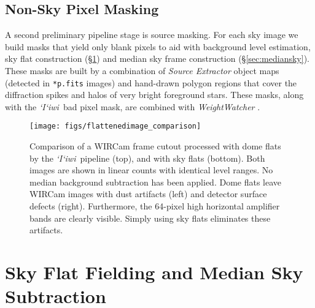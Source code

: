 \documentclass[iop,tighten]{emulateapj}
\newcommand{\sw}[1]{\textit{#1}} %
\newcommand{\iiwione}{\sw{`I`iwi}}
\newcommand{\Sec}[1]{\S\ref{sec:#1}}  %
\begin{document}
\subsection{Non-Sky Pixel Masking}
\label{sec:masks}

A second preliminary pipeline stage is source masking.
For each sky image we build masks that yield only blank pixels to aid with background level estimation, sky flat construction (\Sec{flats}) and median sky frame construction (\Sec{mediansky}).
These masks are built by a combination of \sw{Source Extractor} object maps (detected in \texttt{*p.fits} images) and hand-drawn polygon regions that cover the diffraction spikes and halos of very bright foreground stars.
These masks, along with the \iiwione\ bad pixel mask, are combined with \sw{WeightWatcher} \citep{Marmo:2008}.

\begin{figure}[t]
\centering
\texttt{[image: figs/flattenedimage\_comparison]}
\caption{Comparison of a WIRCam frame cutout processed with dome flats by the \iiwione\ pipeline (top), and with sky flats (bottom).
Both images are shown in linear counts with identical level ranges.
No median background subtraction has been applied.
Dome flats leave WIRCam images with dust artifacts (left) and detector surface defects (right). Furthermore, the 64-pixel high horizontal amplifier bands are clearly visible.
Simply using sky flats eliminates these artifacts.
}
\label{fig:flattenedimage_comparison}
\end{figure}


\section{Sky Flat Fielding and Median Sky Subtraction}
\label{sec:flats}
\end{document}
